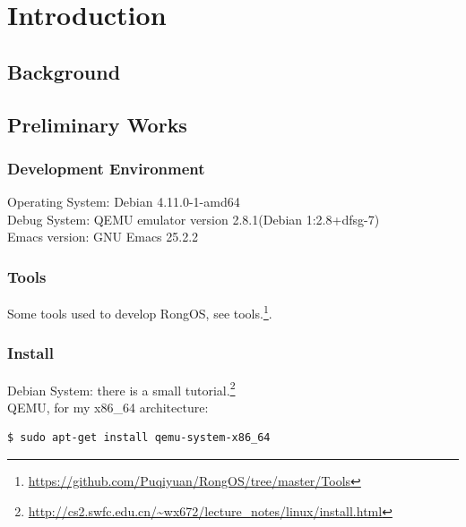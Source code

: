 \documentclass{swfcthesis}
\begin{document}
\makepreliminarypages%
\frontmatter          
\tableofcontents     %
\listoffigures       %
\listoftables        %
\mainmatter
\chapter{Introduction}

\section{Background}
\label{sec:background}


\section{Preliminary Works}

\subsection{Development Environment}
\label{sec:devel-envir}

Operating System: Debian 4.11.0-1-amd64 \\
\hspace*{0.8cm}Debug System: QEMU emulator version 2.8.1(Debian 1:2.8+dfsg-7)\\
\hspace*{0.8cm}Emacs version: GNU Emacs 25.2.2

\subsection{Tools}
\label{sec:tools}

Some tools used to develop RongOS, see
tools.\footnote{\url{https://github.com/Puqiyuan/RongOS/tree/master/Tools}}.

\subsection{Install}
\label{sec:install}

Debian System: there is a small
tutorial.\footnote{\url{http://cs2.swfc.edu.cn/~wx672/lecture_notes/linux/install.html}}\\
\hspace*{0.8cm}QEMU, for my x86\_64 architecture: 
\begin{lstlisting}[language=bash]
     $ sudo apt-get install qemu-system-x86_64
\end{lstlisting}
\end{document}
